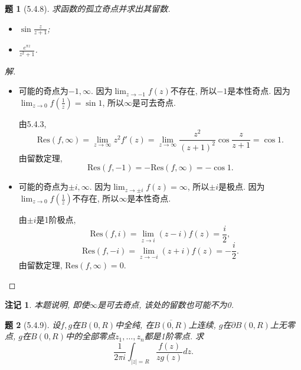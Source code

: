 \documentclass{article}[a4paper, 12pt]
\theoremstyle{mystyle}
\newtheorem{problem}{题}
\newtheorem*{remark}{注记}
\newenvironment{solution}{\begin{proof}[解]}{\end{proof}}
\begin{document}
\begin{problem}[5.4.8]
  求函数的孤立奇点并求出其留数.
  \begin{itemize}
    \item [(6)] \(\sin\frac{z}{z+1}\);
    \item [(8)] \(\frac{e^{\pi z}}{z^2+1}\).
  \end{itemize}
\end{problem}

\begin{solution}
  \begin{itemize}
    \item [(6)] 可能的奇点为\(-1,\infty\). 因为\(\lim_{z\to-1}f(z)\)不存在, 所以\(-1\)是本性奇点. 因为\(\lim_{z\to0}f(\frac{1}{z})=\sin1\), 所以\(\infty\)是可去奇点.
    
    由5.4.3, \[\text{Res}(f,\infty)=\lim_{z\to\infty}z^2f'(z)=\lim_{z\to\infty}\frac{z^2}{(z+1)^2}\cos\frac{z}{z+1}=\cos 1.\]
    由留数定理, \[\text{Res}(f,-1)=-\text{Res}(f,\infty)=-\cos 1.\]
    \item [(8)] 可能的奇点为\(\pm i,\infty\). 因为\(\lim_{z\to \pm i}f(z)=\infty\), 所以\(\pm i\)是极点. 因为\(\lim_{z\to0}f(\frac{1}{z})\)不存在, 所以\(\infty\)是本性奇点.
    
    由\(\pm i\)是1阶极点, \[\text{Res}(f,i)=\lim_{z\to i}(z-i)f(z)=\frac{i}{2},\] \[\text{Res}(f,-i)=\lim_{z\to -i}(z+i)f(z)=-\frac{i}{2}.\]
    由留数定理, \(\text{Res}(f,\infty)=0\). \qedhere
  \end{itemize}
\end{solution}

\begin{remark}
  本题说明, 即使\(\infty\)是可去奇点, 该处的留数也可能不为0.
\end{remark}

\begin{problem}[5.4.9]
  设\(f,g\)在\(B(0,R)\)中全纯, 在\(\overline{B(0,R)}\)上连续, \(g\)在\(\partial B(0,R)\)上无零点, \(g\)在\(B(0,R)\)中的全部零点\(z_1,\dots,z_n\)都是1阶零点. 求\[\frac{1}{2\pi i}\int_{|z|=R}\frac{f(z)}{zg(z)}dz.\]
\end{problem}
\end{document}
